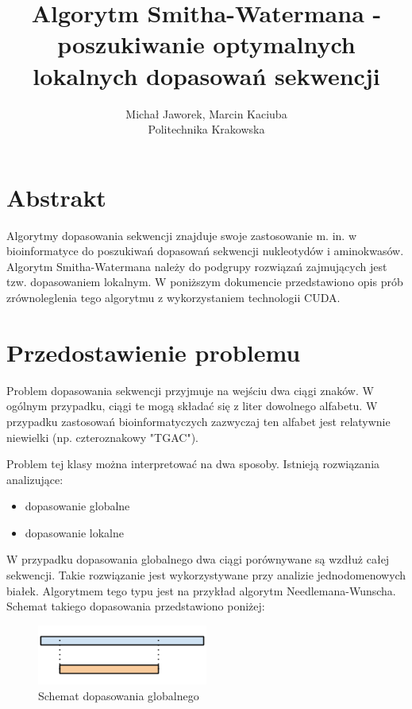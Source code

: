 \documentclass[a4paper,12pt]{article}
\newenvironment{lista}{
\begin{itemize}
  \setlength{\itemsep}{1pt}
  \setlength{\parskip}{0pt}
  \setlength{\parsep}{0pt}
}{\end{itemize}}
\begin{document}
\noindent



\title{Algorytm Smitha-Watermana - poszukiwanie optymalnych lokalnych dopasowań sekwencji }
\author{Michał Jaworek, Marcin Kaciuba\\ Politechnika Krakowska}
\maketitle



\section*{Abstrakt}
Algorytmy dopasowania sekwencji znajduje swoje zastosowanie m. in. w bioinformatyce do poszukiwań dopasowań sekwencji nukleotydów i aminokwasów. Algorytm Smitha-Watermana należy do podgrupy rozwiązań zajmujących jest tzw. dopasowaniem lokalnym. W poniższym dokumencie przedstawiono opis prób zrównoleglenia tego algorytmu z wykorzystaniem technologii CUDA. 

\section*{Przedostawienie problemu}

Problem dopasowania sekwencji przyjmuje na wejściu dwa ciągi znaków. W ogólnym przypadku, ciągi te mogą składać się z liter dowolnego alfabetu. W przypadku zastosowań bioinformatyczych zazwyczaj ten alfabet jest relatywnie niewielki (np. czteroznakowy "TGAC"). 

Problem tej klasy można interpretować na dwa sposoby. Istnieją rozwiązania analizujące:
\begin{lista}
 \item dopasowanie globalne
\item dopasowanie lokalne
\end{lista}

W przypadku dopasowania globalnego dwa ciągi porównywane są wzdłuż całej sekwencji. Takie rozwiązanie jest wykorzystywane przy analizie jednodomenowych białek. Algorytmem tego typu jest na przykład algorytm Needlemana-Wunscha. Schemat takiego dopasowania przedstawiono poniżej: 

\begin{figure}[H]
  \vspace{5pt}
  \centering
  \begin{center}
  \includegraphics[width=0.5\textwidth]{images/Dopasowanie_globalne.png}
  \end{center}
  \caption{Schemat dopasowania globalnego}
 \end{figure}
  
\end{document}
